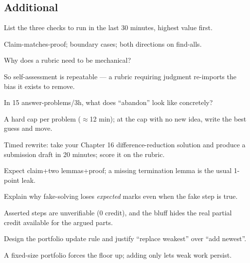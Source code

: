 \subsection*{Additional}
\begin{exercise}[easy]\label{exr:ea1}
List the three checks to run in the last 30 minutes, highest value
first.
\end{exercise}
\begin{solution}
Claim-matches-proof; boundary cases; both directions on find-alls.
\end{solution}
\begin{exercise}[easy]\label{exr:ea2}
Why does a rubric need to be mechanical?
\end{exercise}
\begin{solution}
So self-assessment is repeatable --- a rubric requiring judgment
re-imports the bias it exists to remove.
\end{solution}
\begin{exercise}[easy]\label{exr:ea3}
In 15 answer-problems/3h, what does ``abandon'' look like concretely?
\end{exercise}
\begin{solution}
A hard cap per problem ($\approx$12 min); at the cap with no new idea,
write the best guess and move.
\end{solution}
\begin{exercise}[medium]\label{exr:ea4}
Timed rewrite: take your Chapter 16 difference-reduction solution and
produce a submission draft in 20 minutes; score it on the rubric.
\end{exercise}
\begin{solution}
Expect claim+two lemmas+proof; a missing termination lemma is the
usual 1-point leak.
\end{solution}
\begin{exercise}[medium]\label{exr:ea5}
Explain why fake-solving loses \emph{expected} marks even when the
fake step is true.
\end{exercise}
\begin{solution}
Asserted steps are unverifiable (0 credit), and the bluff hides the
real partial credit available for the argued parts.
\end{solution}
\begin{exercise}[medium]\label{exr:ea6}
Design the portfolio update rule and justify ``replace weakest'' over
``add newest''.
\end{exercise}
\begin{solution}
A fixed-size portfolio forces the floor up; adding only lets weak work
persist.
\end{solution}
